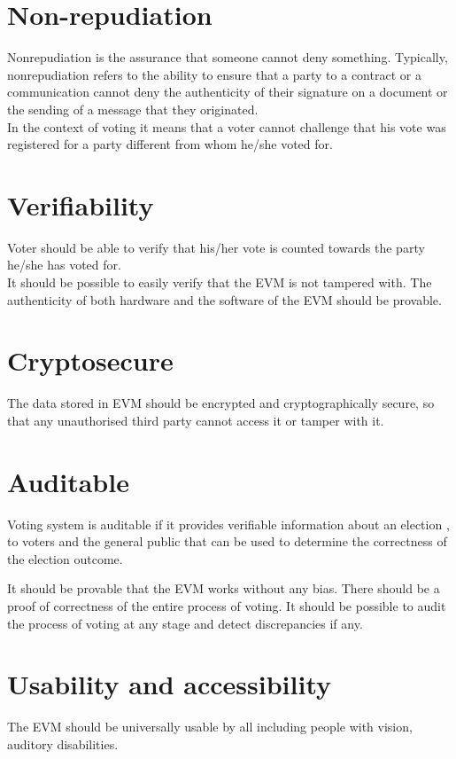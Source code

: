 \documentclass[a4paper,12pt,openany]{book}
\begin{document}
\section{Non-repudiation}
Nonrepudiation is the assurance that someone cannot deny something. Typically, nonrepudiation refers to the ability to ensure that a party to a contract or a communication cannot deny the authenticity of their signature on a document or the sending of a message that they originated. 
\\
In the context of voting it means that a voter cannot challenge that his vote was registered for a party different from whom he/she voted for.

\section{Verifiability}
Voter should be able to verify that his/her vote is counted towards the party he/she has voted for.\\
It should be possible to easily verify that the EVM is not tampered with. The authenticity of both hardware and the software of the EVM should be provable.

\section{Cryptosecure}
The data stored in EVM should be encrypted and cryptographically secure, so that any unauthorised third party cannot access it or tamper with it.

\section{Auditable}
Voting  system  is auditable if it provides verifiable information about  an election
,   to  voters  and  the  general  public
  that  can  be  used  to  determine  the  correctness  of  the  
election outcome.  

It should be provable that the EVM works without any bias. There should be a proof of correctness of the entire process of voting. It should be possible to audit the process of voting at any stage and detect discrepancies if any.

\section{Usability and accessibility}
The EVM should be universally usable by all including people with vision, auditory disabilities.
\end{document}
